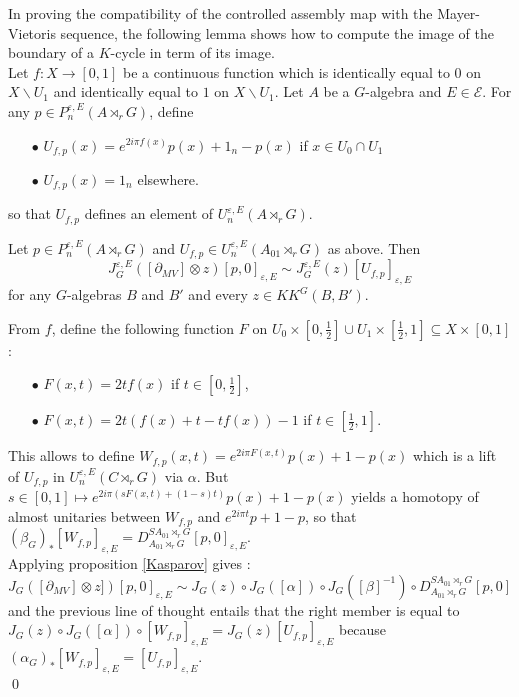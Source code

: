 In proving the compatibility of the controlled assembly map with the Mayer-Vietoris sequence, the following lemma shows how to compute the image of 
the boundary of a $K$-cycle in term of its image.\\

Let $f : X\rightarrow [0,1]$ be a continuous function which is identically equal to $0$ on $X\backslash U_1 $ and identically equal to $1$ on $X\backslash U_1$. Let $A$ be a $G$-algebra and $E\in\mathcal E$. For any $p\in P_n^{\varepsilon,E}(A\rtimes_r G) $, define 
\begin{itemize}
\item[$\bullet$] $U_{f,p}(x) = e^{2i\pi f(x)}p(x) +1_n -p(x)$ if $x\in U_0\cap U_1$
\item[$\bullet$] $U_{f,p}(x) = 1_n$ elsewhere.
\end{itemize}
so that $U_{f,p}$ defines an element of $ U^{\varepsilon,E}_n(A\rtimes_r G)$.\\

\begin{lem}
Let $p\in P_n^{\varepsilon,E}(A\rtimes_r G)$ and $U_{f,p}\in U_n^{\varepsilon,E}(A_{01}\rtimes_r G)$ as above. Then
\[J^{\varepsilon, E}_G([\partial_{MV}]\otimes z ) [p,0]_{\varepsilon, E} \sim J^{\varepsilon, E}_G(z)[U_{f,p}]_{\varepsilon, E}\]
for any $G$-algebras $B$ and $B'$ and every $z\in KK^G(B,B')$.
\end{lem}

\begin{dem}
From $f$, define the following function $F$ on $U_0\times[0,\frac{1}{2}]\cup U_1\times [\frac{1}{2},1]\subseteq X\times[0,1]$: 
\begin{itemize}
\item[$\bullet$] $F(x,t)= 2t f(x)$ if $t\in [0,\frac{1}{2}]$,
\item[$\bullet$] $F(x,t)= 2t (f(x)+t-tf(x))-1$ if $t\in [\frac{1}{2},1]$.
\end{itemize} 
This allows to define $W_{f,p}(x,t)=e^{2i\pi F(x,t)}p(x)+1-p(x)$ which is a lift of $U_{f,p}$ in $U_n^{\varepsilon,E}( C \rtimes_r G)$ via $\alpha$.
But $s\in [0,1]\mapsto e^{2i\pi (sF(x,t)+(1-s)t)}p(x)+1-p(x)$ yields a homotopy of almost unitaries between $W_{f,p}$ and $e^{2i\pi t}p + 1-p$, so that $(\beta_G)_*[W_{f,p}]_{\varepsilon,E}=D_{A_{01}\rtimes_r G}^{SA_{01}\rtimes_r G} [p,0]_{\varepsilon,E}$.\\

Applying proposition \ref{Kasparov} gives : 
\[J_G([\partial_{MV}]\otimes z])[p,0]_{\varepsilon,E} \sim J_G(z)\circ J_G([\alpha])\circ J_G([\beta]^{-1}) \circ D_{A_{01}\rtimes_r G}^{SA_{01}\rtimes_r G} [p,0]  \]
and the previous line of thought entails that the right member is equal to $J_G(z)\circ J_G([\alpha]) \circ [W_{f,p}]_{\varepsilon,E} = J_G(z)[U_{f,p}]_{\varepsilon,E} $ because $(\alpha_G)_* [W_{f,p}]_{\varepsilon,E}=[U_{f,p}]_{\varepsilon,E} $.\\
\qed
\end{dem}

